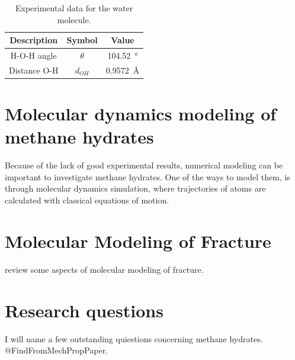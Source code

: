 \begin{table}[h!tb]
\caption{Experimental data for the water molecule.}
\label{tb:intro:h2odata}
\begin{center}
\begin{tabular}{c|c|c}
Description & Symbol & Value \\
\hline
H-O-H angle & $\theta$ & \SI{104.52}{\degree} \\
Distance O-H & $d_{OH}$ & \SI{0.9572}{\angstrom} \\
\end{tabular}
\end{center}
\end{table}





\section{Molecular dynamics modeling of methane hydrates}
Because of the lack of good experimental results, numerical modeling can be important to investigate methane hydrates. One of the ways to model them, is through molecular dynamics simulation, where trajectories of atoms are calculated with classical equations of motion.

\section{Molecular Modeling of Fracture}
\citet{doi:10.1142/9789812773326_0001} review some aspects of molecular modeling of fracture. 


\section{Research questions}
I will name a few outstanding quiestions concerning methane hydrates. @FindFromMechPropPaper.

